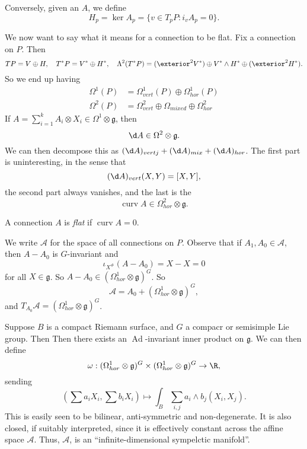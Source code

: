 \documentclass[a4paper]{article}
\DeclareMathOperator{\Ad}{Ad}
\DeclareMathOperator{\curv}{curv}
\begin{document}
\begin{eg}
  Conversely, given an $A$, we define
  \[
    H_p = \ker A_p = \{v \in T_p P : i_v A_p = 0\}.
  \]

  We now want to say what it means for a connection to be flat. Fix a connection on $P$. Then
  \[
    TP = V \oplus H,\quad T^*P = V^* \oplus H^*,\quad \Lambda^2 (T^*P) = (\exterior^2 V^*) \oplus V^* \wedge H^* \oplus (\exterior^2 H^*).
  \]
  So we end up having
  \begin{align*}
    \Omega^1(P) &= \Omega^1_{vert}(P) \oplus \Omega^1_{hor}(P)\\
    \Omega^2(P) &= \Omega_{vert}^2 \oplus \Omega_{mixed} \oplus \Omega^2_{hor}
  \end{align*}
  If $A = \sum_{i = 1}^k A_i \otimes X_i \in \Omega^1 \otimes \mathfrak{g}$, then
  \[
    \d A \in \Omega^2 \otimes \mathfrak{g}.
  \]
  We can then decompose this as $(\d A)_{vertj}+ (\d A)_{mix} + (\d A)_{hor}$. The first part is uninteresting, in the sense that
  \[
    (\d A)_{vert}(X, Y) = [X, Y],
  \]
  the second part always vanishes, and the last is the 
  \[
    \curv A \in \Omega_{hor}^2 \otimes \mathfrak{g}.
  \]
  \begin{defi}
    A connection $A$ is \emph{flat} if $\curv A = 0$.
  \end{defi}
  We write $\mathcal{A}$ for the space of all connections on $P$. Observe that if $A_1, A_0 \in \mathcal{A}$, then $A - A_0$ is $G$-invariant and
  \[
    \iota_{X^\#}(A - A_0) = X - X = 0
  \]
  for all $X \in \mathfrak{g}$. So $A - A_0 \in (\Omega^1_{hor} \otimes \mathfrak{g})^G$. So
  \[
    \mathcal{A} = A_0 + (\Omega^1_{hor} \otimes \mathfrak{g})^G,
  \]
  and $T_{A_0} \mathcal{A} = (\Omega^1_{hor} \otimes \mathfrak{g})^G$.

  Suppose $B$ is a compact Riemann surface, and $G$ a compacr or semisimple Lie group. Then Then there exists an $\Ad$-invariant inner product on $\mathfrak{g}$. We can then define
  \[
    \omega: (\Omega^1_{hor} \otimes \mathfrak{g})^G \times (\Omega_{hor}^1 \otimes \mathfrak{g})^G \to \R,
  \]
  sending
  \[
    \left(\sum a_i X_i, \sum b_i X_i\right) \mapsto \int_B \sum_{i, j} a_i \wedge b_j (X_i, X_j).
  \]
  This is easily seen to be bilinear, anti-symmetric and non-degenerate. It is also closed, if suitably interpreted, since it is effectively constant across the affine space $\mathcal{A}$. Thus, $\mathcal{A}$, is an ``infinite-dimensional sympelctic manifold''.


\end{eg}
\end{document}
